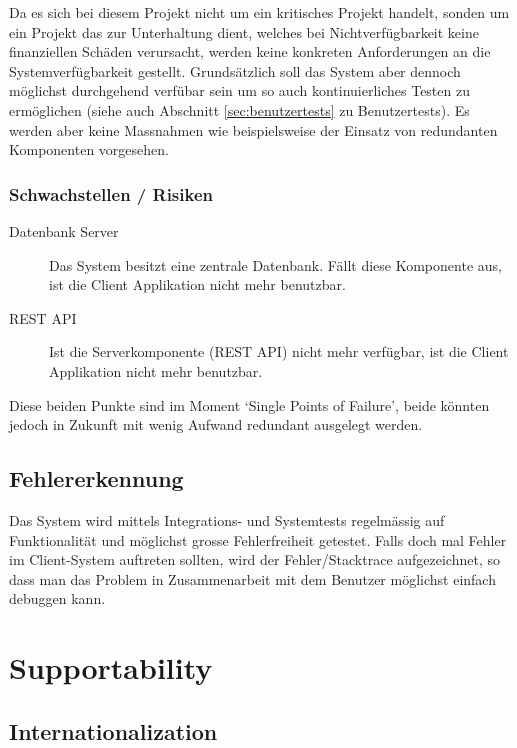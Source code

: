 \documentclass[10pt,a4paper]{scrartcl}
\begin{document}
	Da es sich bei diesem Projekt nicht um ein kritisches Projekt handelt, sonden um ein Projekt das zur Unterhaltung dient, welches bei Nichtverfügbarkeit keine finanziellen Schäden verursacht, werden keine konkreten Anforderungen an die Systemverfügbarkeit gestellt. Grundsätzlich soll das System aber dennoch möglichst durchgehend verfübar sein um so auch kontinuierliches Testen zu ermöglichen (siehe auch Abschnitt \ref{sec:benutzertests} zu Benutzertests). Es werden aber keine Massnahmen wie beispielsweise der Einsatz von redundanten Komponenten vorgesehen.

		\subsubsection{Schwachstellen / Risiken}

		\begin{description}
			\item[Datenbank Server]
				Das System besitzt eine zentrale Datenbank. Fällt diese Komponente aus, ist die Client Applikation nicht mehr benutzbar.
			\item[REST API]
				Ist die Serverkomponente (REST API) nicht mehr verfügbar, ist die Client Applikation nicht mehr benutzbar.
		\end{description}

		Diese beiden Punkte sind im Moment `Single Points of Failure', beide könnten jedoch in Zukunft mit wenig Aufwand redundant ausgelegt werden.

	\subsection{Fehlererkennung}

	Das System wird mittels Integrations- und Systemtests regelmässig auf Funktionalität und möglichst grosse Fehlerfreiheit getestet.
	Falls doch mal Fehler im Client-System auftreten sollten, wird der Fehler/Stacktrace aufgezeichnet, so dass man das Problem in Zusammenarbeit mit dem Benutzer möglichst einfach debuggen kann.


\section{Supportability}

	\subsection{Internationalization}
\end{document}
